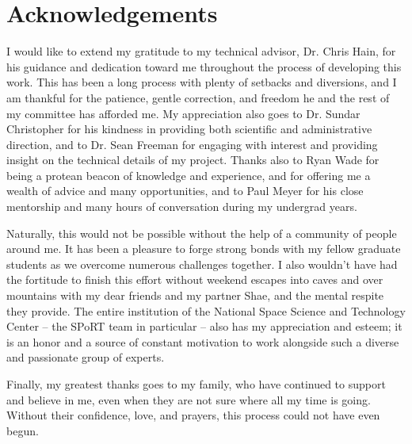 \chapter{Acknowledgements}
\doublespacing

I would like to extend my gratitude to my technical advisor, Dr. Chris Hain, for his guidance and dedication toward me throughout the process of developing this work. This has been a long process with plenty of setbacks and diversions, and I am thankful for the patience, gentle correction, and freedom he and the rest of my committee has afforded me. My appreciation also goes to Dr. Sundar Christopher for his kindness in providing both scientific and administrative direction, and to Dr. Sean Freeman for engaging with interest and providing insight on the technical details of my project. Thanks also to Ryan Wade for being a protean beacon of knowledge and experience, and for offering me a wealth of advice and many opportunities, and to Paul Meyer for his close mentorship and many hours of conversation during my undergrad years.

Naturally, this would not be possible without the help of a community of people around me. It has been a pleasure to forge strong bonds with my fellow graduate students as we overcome numerous challenges together. I also wouldn't have had the fortitude to finish this effort without weekend escapes into caves and over mountains with my dear friends and my partner Shae, and the mental respite they provide. The entire institution of the National Space Science and Technology Center -- the SPoRT team in particular -- also has my appreciation and esteem; it is an honor and a source of constant motivation to work alongside such a diverse and passionate group of experts.

Finally, my greatest thanks goes to my family, who have continued to support and believe in me, even when they are not sure where all my time is going. Without their confidence, love, and prayers, this process could not have even begun.
